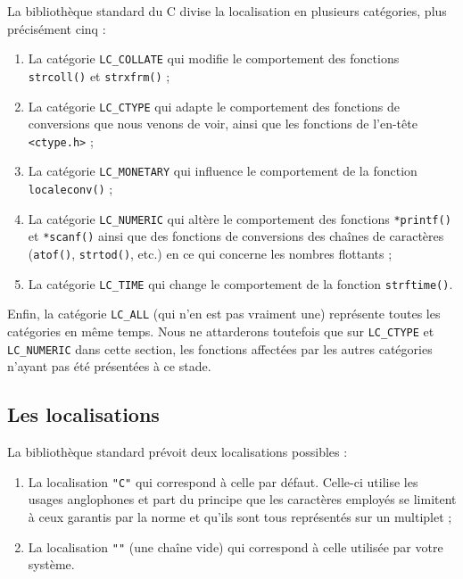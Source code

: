 \documentclass[]{article}
\providecommand{\tightlist}{%
  \setlength{\itemsep}{0pt}\setlength{\parskip}{0pt}}
\begin{document}
La bibliothèque standard du C divise la localisation en plusieurs
catégories, plus précisément cinq :

\begin{enumerate}
\def\labelenumi{\arabic{enumi}.}
\tightlist
\item
  La catégorie \texttt{LC\_COLLATE} qui modifie le comportement des
  fonctions \texttt{strcoll()} et \texttt{strxfrm()} ;
\item
  La catégorie \texttt{LC\_CTYPE} qui adapte le comportement des
  fonctions de conversions que nous venons de voir, ainsi que les
  fonctions de l'en-tête \texttt{\textless{}ctype.h\textgreater{}} ;
\item
  La catégorie \texttt{LC\_MONETARY} qui influence le comportement de la
  fonction \texttt{localeconv()} ;
\item
  La catégorie \texttt{LC\_NUMERIC} qui altère le comportement des
  fonctions \texttt{*printf()} et \texttt{*scanf()} ainsi que des
  fonctions de conversions des chaînes de caractères (\texttt{atof()},
  \texttt{strtod()}, etc.) en ce qui concerne les nombres flottants ;
\item
  La catégorie \texttt{LC\_TIME} qui change le comportement de la
  fonction \texttt{strftime()}.
\end{enumerate}

Enfin, la catégorie \texttt{LC\_ALL} (qui n'en est pas vraiment une)
représente toutes les catégories en même temps. Nous ne attarderons
toutefois que sur \texttt{LC\_CTYPE} et \texttt{LC\_NUMERIC} dans cette
section, les fonctions affectées par les autres catégories n'ayant pas
été présentées à ce stade.

\subsection{Les localisations}\label{les-localisations}

La bibliothèque standard prévoit deux localisations possibles :

\begin{enumerate}
\def\labelenumi{\arabic{enumi}.}
\tightlist
\item
  La localisation \texttt{"C"} qui correspond à celle par défaut.
  Celle-ci utilise les usages anglophones et part du principe que les
  caractères employés se limitent à ceux garantis par la norme et qu'ils
  sont tous représentés sur un multiplet ;
\item
  La localisation \texttt{""} (une chaîne vide) qui correspond à celle
  utilisée par votre système.
\end{enumerate}
\end{document}
